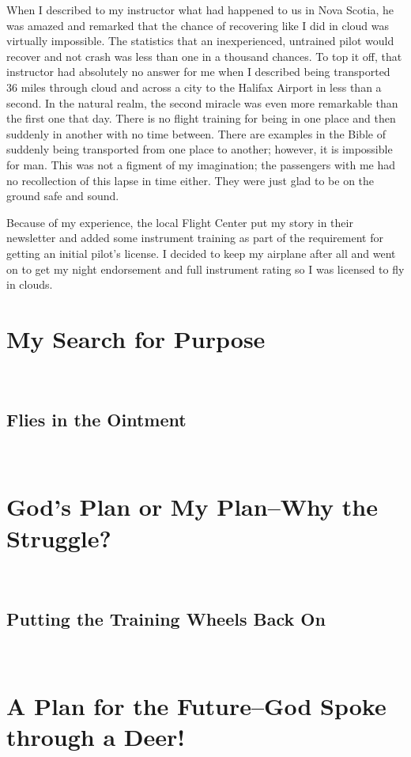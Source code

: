 \documentclass[oneside]{book}
\begin{document}
When I described to my instructor what had happened to us in Nova Scotia, he was amazed and remarked that the chance of recovering like I did in cloud was virtually impossible. The statistics that an inexperienced, untrained pilot would recover and not crash was less than one in a thousand chances. To top it off, that instructor had absolutely no answer for me when I described being transported 36 miles through cloud and across a city to the Halifax Airport in less than a second. In the natural realm, the second miracle was even more remarkable than the first one that day. There is no flight training for being in one place and then suddenly in another with no time between. There are examples in the Bible of suddenly being transported from one place to another; however, it is impossible for man. This was not a figment of my imagination; the passengers with me had no recollection of this lapse in time either. They were just glad to be on the ground safe and sound.

Because of my experience, the local Flight Center put my story in their newsletter and added  some instrument training as part of the requirement for getting an initial pilot’s license. I decided to keep my airplane after all and went on to get my night endorsement and full instrument rating so I was licensed to fly in clouds.

\chapter{My Search for Purpose}
\

\section{Flies in the Ointment}
\

\chapter{God's Plan or My Plan--Why the Struggle?}\

\section{Putting the Training Wheels Back On}
\

\chapter{A Plan for the Future--God Spoke through a Deer!}
\
\end{document}
